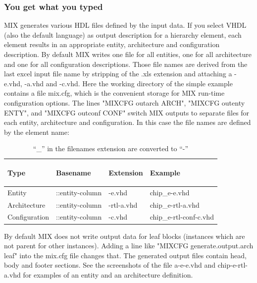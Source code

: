 \documentclass[a4paper,12pt]{article}
\begin{document}
\subsubsection{You get what you typed}
MIX generates various HDL files defined by the input data. If you select VHDL (also the default language) as output description for a hierarchy element, each element results in an appropriate entity, architecture and configuration description. By default MIX writes one file for all entities, one for all architecture and one for all configuration descriptions. Those file names are derived from the last excel input file name by stripping of the .xls extension and attaching a -e.vhd, -a.vhd and -c.vhd.\newline
Here the working directory of the simple example contains a file mix.cfg, which is the convenient storage for MIX run-time configuration options. The lines "MIXCFG outarch ARCH", "MIXCFG outenty ENTY", and "MIXCFG outconf CONF" switch MIX outputs to separate files for each entity, architecture and configuration. In this case the file names are defined by the element name:
\begin{table}[htb]\begin{tabular}{|p{3cm}|p{4cm}|p{3cm}|p{5cm}|}\hline
\begin{bf}Type\end{bf}&\begin{bf}Basename\end{bf}&\begin{bf}Extension\end{bf}&\begin{bf}Example\end{bf}\\\hline
Entity & ::entity-column & -e.vhd & chip\_e-e.vhd \\\hline
Architecture & ::entity-column & -rtl-a.vhd & chip\_e-rtl-a.vhd \\\hline
Configuration & ::entity-column & -c.vhd & chip\_e-rtl-conf-c.vhd\\\hline
\end{tabular}\caption{``\_'' in the filenames extension are converted to ``-''}\end{table}\newline
By default MIX does not write output data for leaf blocks (instances which are not parent for other instances). Adding a line like "MIXCFG generate.output.arch leaf" into the mix.cfg file changes that.\newline
The generated output files contain head, body and footer sections. See the screenshots of the file a-e-e.vhd and chip-e-rtl-a.vhd for examples of an entity and an architecture definition.\\
\end{document}
